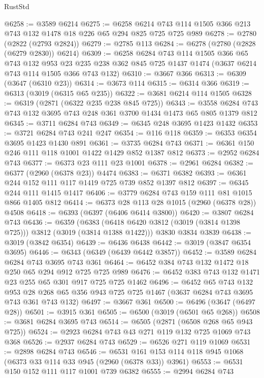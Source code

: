 \begin{lexlean}{RustStd}
\begin{coremodule}
@6258 := @3589 @6214
@6275 := @6258 @6214 @743 @114 @1505 @366 @213 @743 @132 @1478 @18 @226 @65 @294 @825 @725 @725 @989
@6278 := @2780 (@2822 (@2793 @2824))
@6279 := @2785 @113
@6284 := @6278 (@2780 (@2828 (@6279 @2830)) @6214)
@6309 := @6258
    @6284
    @743
    @114
    @1505
    @366
    @65
    @743
    @132
    @953
    @23
    @235
    @238
    @362
    @845
    @725
    @1437
    @1474
    (@3637 @6214 @743 @114 @1505 @366 @743 @132)
@6310 := @3667 @366
@6313 := @6309 (@3647 (@6310 @23))
@6314 := @3673 @114
@6315 := @6314 @366
@6319 := @6313 (@3019 (@6315 @65 @235))
@6322 := @3681 @6214 @114 @1505
@6328 := @6319 (@2871 (@6322 @235 @238 @845 @725))
@6343 := @3558 @6284 @743 @743 @132 @3695 @743 @248 @361 @3700 @1434 @1473 @65 @805 @1379 @812
@6345 := @3711 @6284 @743
@6349 := @6345 @248 @3695 @1423 @1432
@6353 := @3721 @6284 @743 @241 @247
@6354 := @116 @118
@6359 := @6353 @6354 @3695 @1423 @1430 @891
@6361 := @3735 @6284 @743
@6371 := @6361 @150 @246 @111 @118 @1001 @1422 @1429 @852 @1387 @812
@6373 := @2952 @6284 @743
@6377 := @6373 @23 @111 @23 @1001
@6378 := @2961 @6284
@6382 := @6377 (@2960 (@6378 @23)) @4474
@6383 := @6371 @6382
@6393 := @6361 @244 @152 @111 @117 @1419 @725 @739 @852 @1397 @812
@6397 := @6345 @244 @111 @1415 @1417
@6406 := @3779 @6284 @743 @159 @111 @81 @1015 @866 @1405 @812
@6414 := @6373 @28 @113 @28 @1015 (@2960 (@6378 @28)) @4508
@6418 := @6393 (@6397 (@6406 @6414 @3800))
@6420 := @3807 @6284 @743
@6436 := @6359
    (@6383 (@6418 @6420 @3812 (@3019 (@3814 @1398 @725))) @3812 (@3019 (@3814 @1388 @1422)))
    @3830
    @3834
    @3839
@6438 := @3019 (@3842 @6354)
@6439 := @6436 @6438
@6442 := @3019 (@3847 @6354 @3695)
@6446 := @6343 (@6349 (@6439 @6442 @3857))
@6452 := @3589 @6284 @6284 @743 @3695 @743 @361
@6464 := @6452 @384 @743 @132 @1472 @18 @250 @65 @294 @912 @725 @725 @989
@6476 := @6452 @383 @743 @132 @1471 @23 @255 @65 @301 @917 @725 @725 @1462
@6496 := @6452
    @65
    @743
    @132
    @953
    @28
    @268
    @65
    @356
    @943
    @725
    @725
    @1467
    (@3637 @6284 @743 @3695 @743 @361 @743 @132)
@6497 := @3667 @361
@6500 := @6496 (@3647 (@6497 @28))
@6501 := @3915 @361
@6505 := @6500 (@3019 (@6501 @65 @268))
@6508 := @3681 @6284 @3695 @743
@6514 := @6505 (@2871 (@6508 @268 @65 @943 @725))
@6524 := @2923 @6284 @743 @43 @271 @119 @132 @725 @1069 @743 @368
@6526 := @2937 @6284 @743
@6529 := @6526 @271 @119 @1069
@6531 := @2898 @6284 @743
@6546 := @6531 @161 @153 @114 @118 @945 @1068 (@6373 @33 @114 @33 @945 (@2960 (@6378 @33)) @3961)
@6553 := @6531 @150 @152 @111 @117 @1001 @739 @6382
@6555 := @2994 @6284 @743

\end{coremodule}
\end{lexlean}
